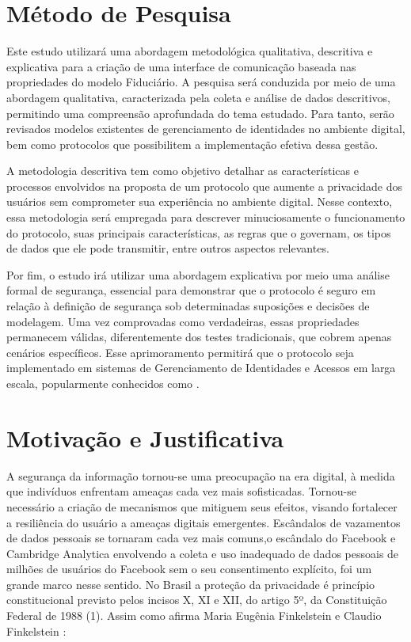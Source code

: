 \section{Método de Pesquisa}\label{section:metodologia}

Este estudo utilizará uma abordagem metodológica qualitativa, descritiva e explicativa para a criação de uma interface de comunicação baseada nas propriedades do modelo Fiduciário. A pesquisa será conduzida por meio de uma abordagem qualitativa, caracterizada pela coleta e análise de dados descritivos, permitindo uma compreensão aprofundada do tema estudado. Para tanto, serão revisados modelos existentes de gerenciamento de identidades no ambiente digital, bem como protocolos que possibilitem a implementação efetiva dessa gestão.

A metodologia descritiva tem como objetivo detalhar as características e processos envolvidos na proposta de um protocolo que aumente a privacidade dos usuários sem comprometer sua experiência no ambiente digital. Nesse contexto, essa metodologia será empregada para descrever minuciosamente o funcionamento do protocolo, suas principais características, as regras que o governam, os tipos de dados que ele pode transmitir, entre outros aspectos relevantes.

Por fim, o estudo irá utilizar uma abordagem explicativa por meio uma análise formal de segurança, essencial para demonstrar que o protocolo é seguro em relação à definição de segurança sob determinadas suposições e decisões de modelagem. Uma vez comprovadas como verdadeiras, essas propriedades permanecem válidas, diferentemente dos testes tradicionais, que cobrem apenas cenários específicos. Esse aprimoramento permitirá que o protocolo seja implementado em sistemas de Gerenciamento de Identidades e Acessos em larga escala, popularmente conhecidos como .

\section{Motivação e Justificativa}\label{section:motivacao-justificativa}

A segurança da informação tornou-se uma preocupação na era digital, à medida que indivíduos enfrentam ameaças cada vez mais sofisticadas. Tornou-se necessário a criação de mecanismos que mitiguem seus efeitos, visando fortalecer a resiliência do usuário a ameaças digitais emergentes. Escândalos de vazamentos de dados pessoais se tornaram cada vez mais comuns,o escândalo do Facebook e Cambridge Analytica \cite{g1_facebook_2018} envolvendo a coleta e uso inadequado de dados pessoais de milhões de usuários do Facebook sem o seu consentimento explícito, foi um grande marco nesse sentido. No Brasil a proteção da privacidade é princípio constitucional previsto pelos incisos X, XI e XII, do artigo 5º, da Constituição Federal de 1988 (1). Assim como afirma Maria Eugênia Finkelstein e Claudio Finkelstein \cite{finkelstein_privacidade_2019}: 

